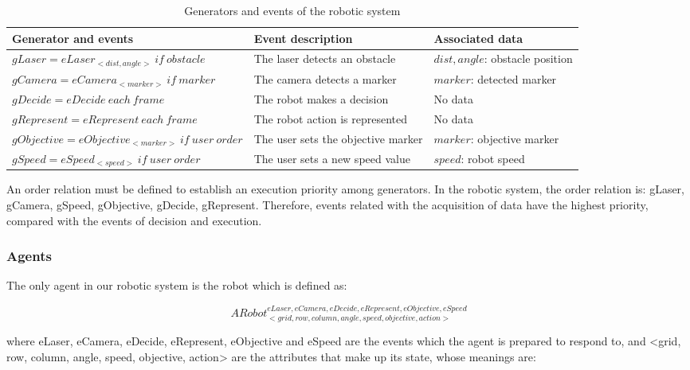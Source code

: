 \documentclass{aamas2012}
\begin{document}
\begin{table*}
\centering
\caption{Generators and events of the robotic system}
\label {tab:GenEvent}
\begin{tabular} {|l|l|l|}
\hline
Generator and events & Event description & Associated data \\
\hline
\hline
$gLaser =  eLaser_{<dist,angle>}  \ if \ obstacle$ & The laser detects an obstacle & $dist, angle$:  obstacle position \\
\hline
$gCamera = eCamera_{<marker>} \ if \ marker$ & The camera detects a marker & $marker$: detected marker \\
\hline
$gDecide = eDecide \ each \ frame$ & The robot makes a decision & No data \\
\hline
$gRepresent = eRepresent \ each \ frame$ & The robot action is represented & No data \\
\hline
$gObjective = eObjective_{<marker>} \ if \ user \ order$ & The user sets the objective marker & $marker$: objective marker \\
\hline
$gSpeed = eSpeed_{<speed>} \ if \ user \ order$ & The user sets a new speed value & $speed$: robot speed \\
\hline
\end{tabular}
\end{table*}

An order relation must be defined to establish an execution priority among generators. In the robotic system, the order relation is: gLaser, gCamera, gSpeed, gObjective, gDecide, gRepresent. Therefore, events related with the acquisition of data have the highest priority, compared with the events of decision and execution.

\subsubsection{Agents}
The only agent in our robotic system is the robot which is defined as:

\begin{small}
\begin{displaymath}
ARobot^{eLaser, eCamera, eDecide, eRepresent, eObjective, eSpeed}_{<grid, row, column, angle, speed, objective, action>}
\end{displaymath}
\end{small}

where eLaser, eCamera, eDecide, eRepresent, eObjective and eSpeed are the events which the agent is prepared to respond to, and <grid, row, column, angle, speed, objective, action> are the attributes that make up its state, whose meanings are:
\end{document}

